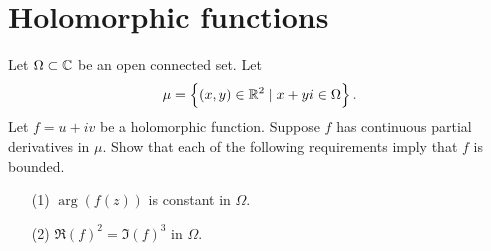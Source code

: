 \documentclass[11pt,a4paper]{article}
\begin{document}
\maketitle

\newpage
\tableofcontents
\newpage

\section{Holomorphic functions}
\begin{exercise}
  Let $\Omega \subset \mathbb{C}$ be an open connected set.
  Let
  \[
    \mu = \set{(x,y) \in \mathbb{R}^2 \mid x + yi \in \Omega}.
  \]
  Let $f = u + i v$ be a holomorphic function.
  Suppose $f$ has continuous partial derivatives in $\mu$.
  Show that each of the following requirements imply that $f$ is bounded.
  \begin{enumerate}
    \item[(1)] $\arg(f(z))$ is constant in $\Omega$.
    \item[(2)] $\Re(f)^2 = \Im(f)^3$ in $\Omega$.
  \end{enumerate}
\end{exercise}
\end{document}
